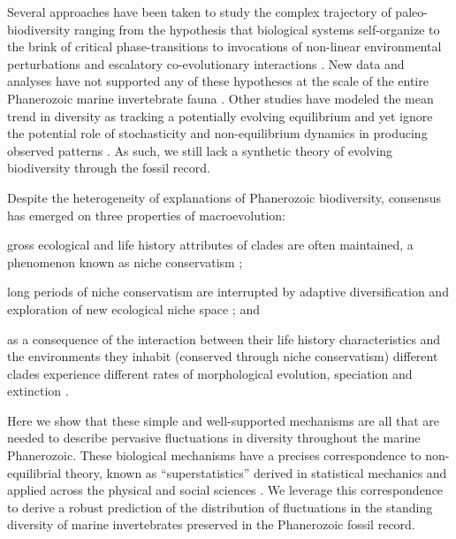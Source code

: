 \documentclass[12pt]{article}
\let\citep=\autocite
\begin{document}
Several approaches have been taken to study the complex trajectory of
paleo-biodiversity ranging from the hypothesis that biological systems
self-organize to the brink of critical phase-transitions
\citep{bak1993, sole1997} to invocations of non-linear environmental
perturbations \citep{newman1995} and escalatory co-evolutionary
interactions \citep{vermeij1987}. New data and analyses have not
supported any of these hypotheses at the scale of the entire
Phanerozoic marine invertebrate fauna \citep{kirchner1998, madin2006,
  alroy08}. Other studies have modeled the mean trend in diversity as
tracking a potentially evolving equilibrium \citep{sepkoski1984,
  alroy08, alroy2010, rabosky2009ecolLett} and yet ignore the
potential role of stochasticity and non-equilibrium dynamics in
producing observed patterns \citep{erwin2012, liow2007,
  quental2013}. As such, we still lack a synthetic theory of evolving
biodiversity through the fossil record.

Despite the heterogeneity of explanations of Phanerozoic
biodiversity, consensus has emerged on three properties of
macroevolution:
\begin{inparaenum}
\item gross ecological and life history attributes of clades
  are often maintained, a phenomenon known as niche conservatism
  \citep{roy2009range, hopkins2014};
\item long periods of niche conservatism are interrupted by adaptive
  diversification and exploration of new ecological niche space
  \citep{eldredgeGould1972, newman1985adaptive, hopkins2014}; and
\item as a consequence of the interaction between their life history
  characteristics and the environments they inhabit
  \citep{vrba1983} (conserved through niche conservatism) different
  clades experience different rates of morphological evolution,
  speciation and extinction \citep{simpson1953, sepkoski1984,
    holman1989, gilinsky1994}.
\end{inparaenum}

Here we show that these simple and well-supported mechanisms are all
that are needed to describe pervasive fluctuations in diversity
throughout the marine Phanerozoic.  These biological mechanisms have a
precises correspondence to non-equilibrial theory, known as
``superstatistics'' derived in statistical mechanics \citep{beck2003}
and applied across the physical and social sciences \citep{beck2004,
  fuentes2009}. We leverage this correspondence to derive a robust
prediction of the distribution of fluctuations in the standing
diversity of marine invertebrates preserved in the Phanerozoic fossil
record.
\end{document}
